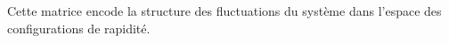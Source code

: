 Cette matrice encode la structure des fluctuations du système dans l’espace des configurations de rapidité.




{\color{blue} 


 





}
